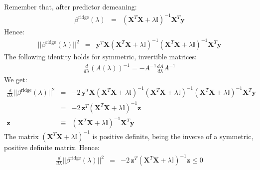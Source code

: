 

Remember that, after predictor demeaning:
\begin{eqnarray*}
    \beta^{\textrm{ridge}}(\lambda) & = & \left( \mathbf{X} ^T \mathbf{X} + \lambda \mathbb{I} \right)^{-1} \mathbf{X}^T \mathbf{y}
\end{eqnarray*}
Hence:
\begin{eqnarray*}
    ||\beta^{\textrm{ridge}}(\lambda)|| ^2 & = & \mathbf{y} ^T \mathbf{X} \left( \mathbf{X} ^T \mathbf{X} + \lambda \mathbb{I} \right)^{-1} \left( \mathbf{X} ^T \mathbf{X} + \lambda \mathbb{I} \right)^{-1} \mathbf{X} ^T \mathbf{y}
\end{eqnarray*}
The following identity holds for symmetric, invertible matrices:
\begin{eqnarray*}
    \frac{d}{d \lambda} \left( A(\lambda) \right)^{-1} = - A^{-1} \frac{dA}{d \lambda} A^{-1}
\end{eqnarray*}
We get:
\begin{eqnarray*}
    \frac{d}{d \lambda} ||\beta^{\textrm{ridge}}(\lambda)|| ^2 & = & - 2\, \mathbf{y} ^T \mathbf{X} \left( \mathbf{X} ^T \mathbf{X} + \lambda \mathbb{I} \right)^{-1} \left( \mathbf{X} ^T \mathbf{X} + \lambda \mathbb{I} \right)^{-1} \left( \mathbf{X} ^T \mathbf{X} + \lambda \mathbb{I} \right)^{-1} \mathbf{X} ^T \mathbf{y} \\
    & = & -2\, \mathbf{z}^T \left( \mathbf{X} ^T \mathbf{X} + \lambda \mathbb{I} \right)^{-1} \mathbf{z} \\
    \mathbf{z} & \equiv & \left( \mathbf{X} ^T \mathbf{X} + \lambda \mathbb{I} \right)^{-1} \mathbf{X}^T \mathbf{y} 
\end{eqnarray*}
The matrix $\left( \mathbf{X} ^T \mathbf{X} + \lambda \mathbb{I} \right)^{-1}$ is positive definite, being the inverse of a symmetric, positive definite matrix. Hence:
\begin{eqnarray*}
    \frac{d}{d \lambda} ||\beta^{\textrm{ridge}}(\lambda)|| ^2 & = & -2\, \mathbf{z}^T \left( \mathbf{X} ^T \mathbf{X} + \lambda \mathbb{I} \right)^{-1} \mathbf{z} \leq 0
\end{eqnarray*}